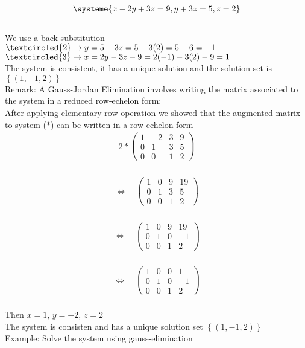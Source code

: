 \documentclass{jhwhw}
\begin{document}
\begin{align*} \systeme{x-2y+3z=9,y+3z=5,z=2} \end{align*}\\

We use a back substitution\\

\(\textcircled{2} \rightarrow y=5-3z=5-3(2) = 5-6 = -1\)\\
\(\textcircled{3} \rightarrow x=2y-3z-9 = 2(-1)-3(2)-9=1\)\\

The system is consistent, it has a unique solution and the solution set is \(\left\{ (1,-1,2) \right\}\)\\

Remark: A Gauss-Jordan Elimination involves writing the matrix associated to the system in a \underline{reduced} row-echelon form:\\

After applying elementary row-operation we showed that the augmented matrix to system (\(\ast\)) can be written in a row-echelon form\\

\begin{align*} 2 \ast \begin{pmatrix} 1 & -2 & 3 & 9 \\ 0 & 1 & 3 & 5 \\ 0 & 0 & 1 & 2 \end{pmatrix}\end{align*}\\

\begin{align*} \Leftrightarrow \quad \begin{pmatrix} 1 & 0 & 9 & 19 \\ 0 & 1 & 3 & 5 \\ 0 & 0 & 1 & 2 \end{pmatrix} \end{align*}\\

\begin{align*} \Leftrightarrow \quad \begin{pmatrix} 1 & 0 & 9 & 19 \\ 0 & 1 & 0 & -1 \\ 0 & 0 & 1 & 2 \end{pmatrix} \end{align*}\\

\begin{align*} \Leftrightarrow \quad \begin{pmatrix} 1 & 0 & 0 & 1 \\ 0 & 1 & 0 & -1 \\ 0 & 0 & 1 & 2 \end{pmatrix} \end{align*}\\

Then \(x=1, \, y=-2, \, z=2\)\\
The system is consisten and has a unique solution set \(\left\{(1,-1,2)\right\}\)\\

Example: Solve the system using gauss-elimination
\end{document}
